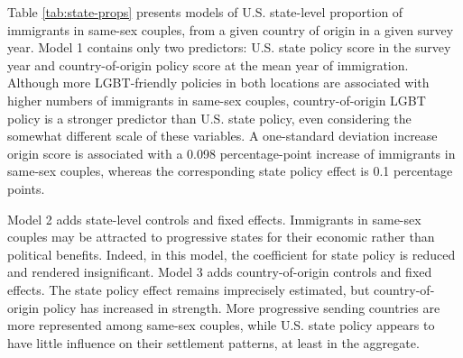 \documentclass[
  11pt,
]{article}
\begin{document}
Table \ref{tab:state-props} presents models of U.S. state-level proportion of immigrants in same-sex couples, from a given country of origin in a given survey year. Model 1 contains only two predictors: U.S. state policy score in the survey year and country-of-origin policy score at the mean year of immigration. Although more LGBT-friendly policies in both locations are associated with higher numbers of immigrants in same-sex couples, country-of-origin LGBT policy is a stronger predictor than U.S. state policy, even considering the somewhat different scale of these variables. A one-standard deviation increase origin score is associated with a 0.098 percentage-point increase of immigrants in same-sex couples, whereas the corresponding state policy effect is 0.1 percentage points.

Model 2 adds state-level controls and fixed effects. Immigrants in same-sex couples may be attracted to progressive states for their economic rather than political benefits. Indeed, in this model, the coefficient for state policy is reduced and rendered insignificant. Model 3 adds country-of-origin controls and fixed effects. The state policy effect remains imprecisely estimated, but country-of-origin policy has increased in strength. More progressive sending countries are more represented among same-sex couples, while U.S. state policy appears to have little influence on their settlement patterns, at least in the aggregate.
\end{document}
